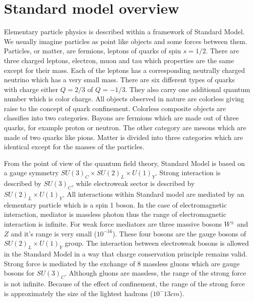 \section{Standard model overview}

\par Elementary particle physics is described within a framework of Standard Model. We usually imagine particles as point like objects and some forces between them. Particles, or matter, are fermions, leptons of quarks of spin $s=1/2$. There are three charged leptons, electron, muon and tau which properties are the same except for their mass. Each of the leptons has a corresponding neutrally charged neutrino which has a very small mass. There are six different types of quarks with charge either $Q=2/3$ of $Q=-1/3$. They also carry one additional quantum number which is color charge. All objects observed in nature are colorless giving raise to the concept of quark confinement. Colorless composite objects are classifies into two categories. Bayons are fermions which are made out of three  quarks, for example proton or neutron. The other category are mesons which are made of two quarks like pions. Matter is divided into three categories which are identical except for the masses of the particles. 
\par From the point of view of the quantum field theory, Standard Model is based on a gauge symmetry $SU(3)_C \times SU(2)_L \times U(1)_Y$. Strong interaction is described by $SU(3)_C$, while electroweak sector is described by $SU(2)_L \times U(1)_Y$. All interactions within Standard model are mediated by an elementary particle which is a spin 1 boson. In the case of electromagnetic interaction, mediator is massless photon thus the range of electromagnetic interaction is infinite. For weak force mediators are three massive bosons $W^{\pm}$ and $Z$ and it's range is very small ($10^{-16}$). These four bosons are the gauge bosons of $SU(2)_L \times U(1)_Y$ group. The interaction between electroweak bosons is allowed in the Standard Model in a way that charge conservation principle remains valid. Strong force is mediated by the exchange of 8 massless gluons which are gauge bosons for $SU(3)_C$. Although gluons are massless, the range of the strong force is not infinite. Because of the effect of confinement, the range of the strong force is approximately the size of the lightest hadrons ($10^-{13} cm$). 

